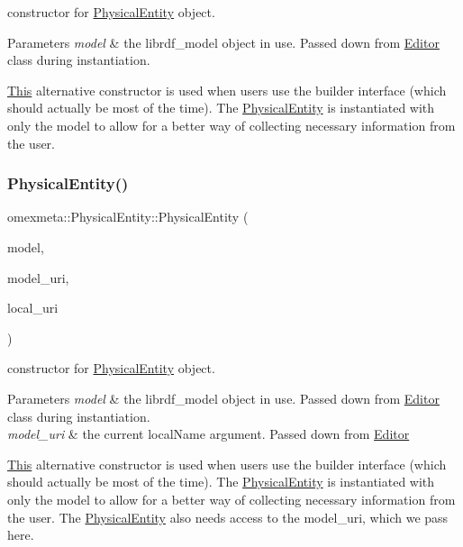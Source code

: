 constructor for \hyperlink{classomexmeta_1_1PhysicalEntity}{Physical\+Entity} object. 


\begin{DoxyParams}{Parameters}
{\em model} & the librdf\+\_\+model object in use. Passed down from \hyperlink{classomexmeta_1_1Editor}{Editor} class during instantiation.\\
\hline
\end{DoxyParams}
\hyperlink{classThis}{This} alternative constructor is used when users use the builder interface (which should actually be most of the time). The \hyperlink{classomexmeta_1_1PhysicalEntity}{Physical\+Entity} is instantiated with only the model to allow for a better way of collecting necessary information from the user. \mbox{\label{classomexmeta_1_1PhysicalEntity_a5f583e60ad44bbb3dfcd11fdc6bc72cc}} 
\subsubsection{\texorpdfstring{Physical\+Entity()}{PhysicalEntity()}\hspace{0.1cm}{\footnotesize\ttfamily [4/4]}}
{\footnotesize\ttfamily omexmeta\+::\+Physical\+Entity\+::\+Physical\+Entity (\begin{DoxyParamCaption}\item[{librdf\+\_\+model $\ast$}]{model,  }\item[{const std\+::string \&}]{model\+\_\+uri,  }\item[{const std\+::string \&}]{local\+\_\+uri }\end{DoxyParamCaption})\hspace{0.3cm}{\ttfamily [explicit]}}



constructor for \hyperlink{classomexmeta_1_1PhysicalEntity}{Physical\+Entity} object. 


\begin{DoxyParams}{Parameters}
{\em model} & the librdf\+\_\+model object in use. Passed down from \hyperlink{classomexmeta_1_1Editor}{Editor} class during instantiation. \\
\hline
{\em model\+\_\+uri} & the current local\+Name argument. Passed down from \hyperlink{classomexmeta_1_1Editor}{Editor}\\
\hline
\end{DoxyParams}
\hyperlink{classThis}{This} alternative constructor is used when users use the builder interface (which should actually be most of the time). The \hyperlink{classomexmeta_1_1PhysicalEntity}{Physical\+Entity} is instantiated with only the model to allow for a better way of collecting necessary information from the user. The \hyperlink{classomexmeta_1_1PhysicalEntity}{Physical\+Entity} also needs access to the model\+\_\+uri, which we pass here. 

